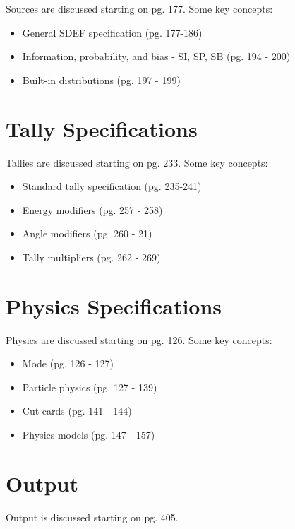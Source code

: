 \documentclass[12pt]{article}
\begin{document}
Sources are discussed starting on pg. 177.
Some key concepts:

\begin{itemize}
  \item General SDEF specification (pg. 177-186)
  \item Information, probability, and bias - SI, SP, SB (pg. 194 - 200)
  \item Built-in distributions (pg. 197 - 199)
\end{itemize}

\section*{Tally Specifications}

Tallies are discussed starting on pg. 233.
Some key concepts:

\begin{itemize}
  \item Standard tally specification (pg. 235-241)
  \item Energy modifiers (pg. 257 - 258)
  \item Angle modifiers (pg. 260 - 21)
  \item Tally multipliers (pg. 262 - 269)
\end{itemize}

\section*{Physics Specifications}

Physics are discussed starting on pg. 126.
Some key concepts:

\begin{itemize}
  \item Mode (pg. 126 - 127)
  \item Particle physics (pg. 127 - 139)
  \item Cut cards (pg. 141 - 144)
  \item Physics models (pg. 147 - 157)
\end{itemize}

\section*{Output}

Output is discussed starting on pg. 405.
\end{document}
